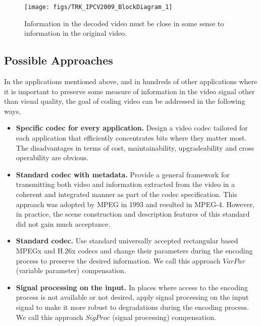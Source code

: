 \documentclass{article}
\begin{document}
			\begin{figure}				
					\texttt{[image: figs/TRK\_IPCV2009\_BlockDiagram\_1]}
					\caption{Information in the decoded video must be close in some sense to information in the original video.}
					\label{fig:ProblemStatement}
			\end{figure}

\subsection{Possible Approaches}
In the applications mentioned above, and in hundreds of other applications where it is important to preserve some measure of information in the video signal other than visual quality, the goal of coding video can be addressed in the following ways,

\begin{itemize}

\item \textbf{Specific codec for every application.} Design a video codec tailored for each application that efficiently concentrates bits where they matter most.  The disadvantages in terms of cost, maintainability, upgradeability and cross operability are obvious.

\item \textbf{Standard codec with metadata.}  Provide a general framework for transmitting both video and information extracted from the video in a coherent and integrated manner as part of the codec specification.  This approach was adopted by MPEG in 1993 and resulted in MPEG-4.  However, in practice, the scene construction and description features of this standard did not gain much acceptance.

\item \textbf{Standard codec.}  Use standard universally accepted rectangular based MPEGx and H.26x codecs and change their parameters during the encoding process to preserve the desired information.  We call this approach $VarPar$ (variable parameter) compensation.

\item \textbf{Signal processing on the input.}  In places where access to the encoding process is not available or not desired, apply signal processing on the input signal to make it more robust to degradations during the encoding process.  We call this approach $SigProc$ (signal processing) compensation.

\end{itemize}
\end{document}

